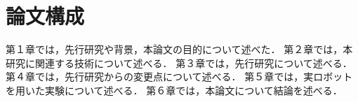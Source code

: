 \section{論文構成}
第１章では，先行研究や背景，本論文の目的について述べた．
第２章では，本研究に関連する技術について述べる．
第３章では，先行研究について述べる．
第４章では，先行研究からの変更点について述べる．
第５章では，実ロボットを用いた実験について述べる．
第６章では，本論文について結論を述べる．